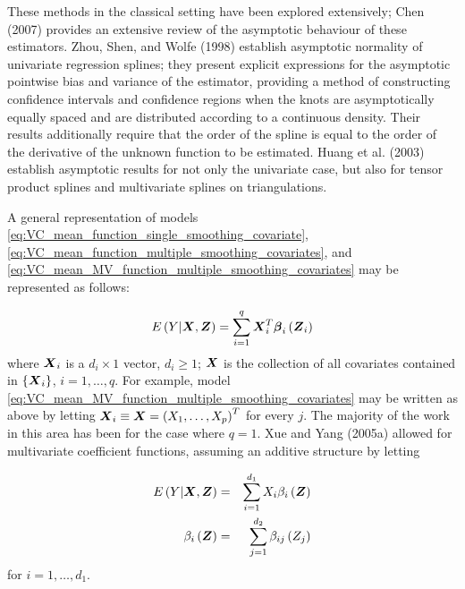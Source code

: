 \documentclass[12pt]{article}
\newcommand{\bfbeta}{\mbox{\boldmath $\beta$}}
\newcommand{\bfX}{\mbox{\boldmath $X$}}
\newcommand{\bfZ}{\mbox{\boldmath $Z$}}
\begin{document}
These methods in the classical setting have been explored extensively; Chen (2007) provides an extensive review of the asymptotic behaviour of these estimators. Zhou, Shen, and Wolfe (1998) establish asymptotic normality of univariate regression splines; they present explicit expressions for the asymptotic pointwise bias and variance of the estimator, providing a method of constructing confidence intervals and confidence regions when the knots are asymptotically equally spaced and are distributed according to a continuous density. Their results additionally require that the order of the spline is equal to the order of the derivative of the unknown function to be estimated. Huang et al. (2003) establish asymptotic results for not only the univariate case, but also for tensor product splines and multivariate splines on triangulations.  

A general representation of models \ref{eq:VC_mean_function_single_smoothing_covariate}, \ref{eq:VC_mean_function_multiple_smoothing_covariates}, and \ref{eq:VC_mean_MV_function_multiple_smoothing_covariates} may be represented as follows:

\begin{equation} \label{eq:general_VC_model}
E\left(Y \vert \bfX, \bfZ\right) = \sum_{i=1}^q \bfX_i^T \bfbeta_i\left(\bfZ_i\right)
\end{equation}
\noindent
where $\bfX_i$ is a $d_i \times 1$ vector, $d_i \ge 1$; $\bfX$ is the collection of all covariates contained in $\left\{ \bfX_i \right\}$, $i=1,\dots,q$. For example, model \ref{eq:VC_mean_MV_function_multiple_smoothing_covariates} may be written as above by letting $\bfX_i \equiv \bfX = \left(X_1,\dots, X_p\right)^T$ for every $j$. The majority of the work in this area has been for the case where $q=1$.  Xue and Yang (2005a) allowed for multivariate coefficient functions, assuming an additive structure by letting

\begin{eqnarray} 
E\left(Y \vert \bfX, \bfZ\right) &=& \sum_{i=1}^{d_1} X_i \beta_i\left(\bfZ\right) \label{eq:xue_VC_model}\\
\beta_i\left(\bfZ\right) &=& \sum_{j=1}^{d_2} \beta_{ij}\left(Z_j\right) \nonumber
\end{eqnarray}
\noindent
for $i=1,\dots, d_1$.

 
\end{document}
